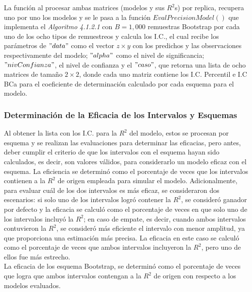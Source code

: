 La función al procesar ambas matrices (modelos y sus $R^2$s) por replica, recupera uno por uno los modelos y se le pasa a la función $EvalPrecisionModel()$ que implementa el \textit{Algoritmo 4.1.2.1} con $B=1,000$ remuestras Bootstrap por cada uno de los ocho tipos de remuestreos y calcula los I.C., el cual recibe los parámetros de $"data"$ como el vector $ z \times y $ con los predichos y las observaciones respectivamente del modelo;  $"alpha"$ como el nivel de significancia; $" nivConfianza" $, el nivel de confianza y el $"caso"$, que retorna una lista de ocho matrices de tamaño $2 \times 2$, donde cada uno matriz contiene los I.C. Percentil e I.C BCa para el coeficiente de determinación calculado por cada esquema para el modelo.\\


\subsubsection{Determinación de la Eficacia de los Intervalos y Esquemas}

Al obtener la lista con los I.C. para la $R^2$ del modelo, estos se procesan por esquema y  se realizan las evaluaciones para determinar las eficacias, pero antes, deber cumplir el criterio de que los intervalos con el esquema hayan sido calculados, es decir, son valores válidos, para considerarlo un modelo eficaz con el esquema. La eficiencia se determinó como el porcentaje de veces que los intervalos contienen a la \( R^2 \) de origen empleada para simular el modelo. Adicionalmente, para evaluar cuál de los dos intervalos es más eficaz, se consideraron dos escenarios: si solo uno de los intervalos logró contener la \( R^2 \), se consideró ganador por defecto y la eficacia se calculó como el porcentaje de veces en que solo uno de los intervalos incluyó la \( R^2 \); en caso de empate, es decir, cuando ambos intervalos contuvieron la \( R^2 \), se consideró más eficiente el intervalo con menor amplitud, ya que proporciona una estimación más precisa. La eficacia en este caso se calculó como el porcentaje de veces que ambos intervalos incluyeron la \( R^2 \), pero uno de ellos fue más estrecho.\\

La eficacia de los esquema Bootstrap, se determinó como el porcentaje de veces que logra que ambos intervalos contengan a la \( R^2 \) de origen con respecto a los modelos evaluados.\\

